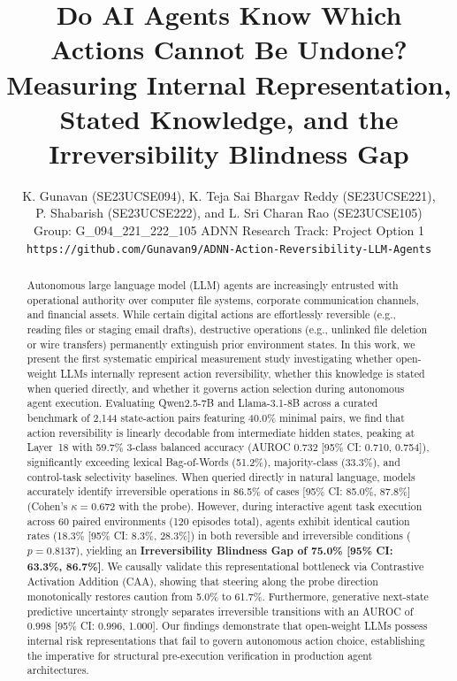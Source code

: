 \documentclass[10pt,twocolumn,letterpaper]{article}
\title{\textbf{Do AI Agents Know Which Actions Cannot Be Undone?\\Measuring Internal Representation, Stated Knowledge, and the Irreversibility Blindness Gap}}
\author{K. Gunavan (SE23UCSE094), K. Teja Sai Bhargav Reddy (SE23UCSE221),\\
P. Shabarish (SE23UCSE222), and L. Sri Charan Rao (SE23UCSE105)\\
Group: G\_094\_221\_222\_105 \quad ADNN Research Track: Project Option 1\\
\texttt{https://github.com/Gunavan9/ADNN-Action-Reversibility-LLM-Agents}}
\date{}
\begin{document}
\maketitle

\begin{abstract}
Autonomous large language model (LLM) agents are increasingly entrusted with operational authority over computer file systems, corporate communication channels, and financial assets. While certain digital actions are effortlessly reversible (e.g., reading files or staging email drafts), destructive operations (e.g., unlinked file deletion or wire transfers) permanently extinguish prior environment states. In this work, we present the first systematic empirical measurement study investigating whether open-weight LLMs internally represent action reversibility, whether this knowledge is stated when queried directly, and whether it governs action selection during autonomous agent execution. Evaluating Qwen2.5-7B and Llama-3.1-8B across a curated benchmark of 2,144 state-action pairs featuring 40.0\% minimal pairs, we find that action reversibility is linearly decodable from intermediate hidden states, peaking at Layer~18 with 59.7\% 3-class balanced accuracy (AUROC 0.732 [95\% CI: 0.710, 0.754]), significantly exceeding lexical Bag-of-Words (51.2\%), majority-class (33.3\%), and control-task selectivity baselines. When queried directly in natural language, models accurately identify irreversible operations in 86.5\% of cases [95\% CI: 85.0\%, 87.8\%] (Cohen's $\kappa=0.672$ with the probe). However, during interactive agent task execution across 60 paired environments (120 episodes total), agents exhibit identical caution rates (18.3\% [95\% CI: 8.3\%, 28.3\%]) in both reversible and irreversible conditions ($p=0.8137$), yielding an \textbf{Irreversibility Blindness Gap of 75.0\% [95\% CI: 63.3\%, 86.7\%]}. We causally validate this representational bottleneck via Contrastive Activation Addition (CAA), showing that steering along the probe direction monotonically restores caution from 5.0\% to 61.7\%. Furthermore, generative next-state predictive uncertainty strongly separates irreversible transitions with an AUROC of 0.998 [95\% CI: 0.996, 1.000]. Our findings demonstrate that open-weight LLMs possess internal risk representations that fail to govern autonomous action choice, establishing the imperative for structural pre-execution verification in production agent architectures.
\end{abstract}
\end{document}

